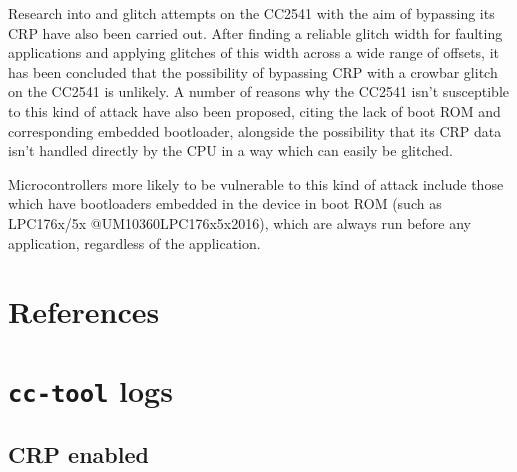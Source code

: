 Research into and glitch attempts on the CC2541 with the aim of
bypassing its CRP have also been carried out. After finding a reliable
glitch width for faulting applications and applying glitches of this
width across a wide range of offsets, it has been concluded that the
possibility of bypassing CRP with a crowbar glitch on the CC2541 is
unlikely. A number of reasons why the CC2541 isn't susceptible to this
kind of attack have also been proposed, citing the lack of boot ROM and
corresponding embedded bootloader, alongside the possibility that its
CRP data isn't handled directly by the CPU in a way which can easily be
glitched.

Microcontrollers more likely to be vulnerable to this kind of attack
include those which have bootloaders embedded in the device in boot ROM
(such as LPC176x/5x @UM10360LPC176x5x2016), which are always run before
any application, regardless of the application.

\hypertarget{references}{%
\section{References}\label{references}}

\vspace{0.5cm}

\hypertarget{refs}{}
\begin{CSLReferences}{0}{0}
\end{CSLReferences}

\appendix

\hypertarget{cc-tool-logs}{%
\section{\texorpdfstring{\texttt{cc-tool}
logs}{cc-tool logs}}\label{cc-tool-logs}}

\hypertarget{crp-enabled}{%
\subsection{\texorpdfstring{CRP
enabled\label{appendix_crp_enabled}}{CRP enabled}}\label{crp-enabled}}

